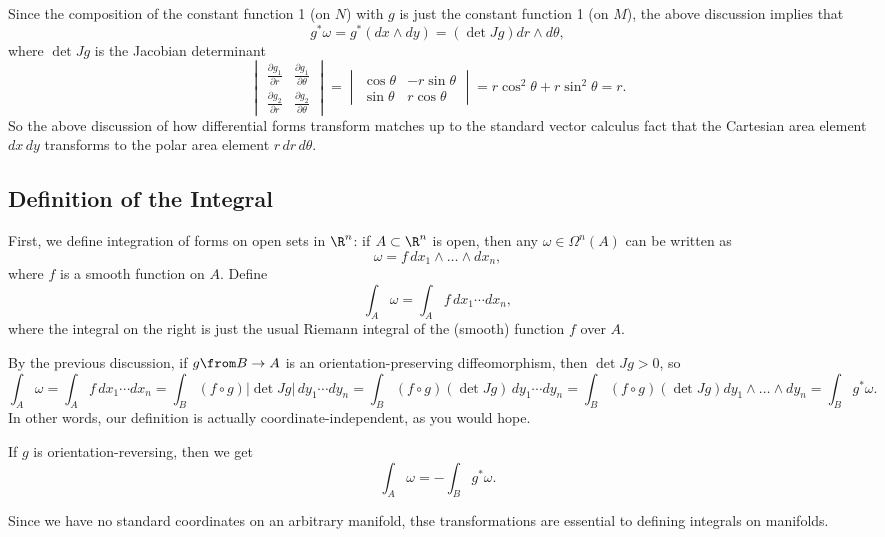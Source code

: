 \begin{example}
	Since the composition of the constant function 1 (on $N$) with $g$ is just the constant function 1 (on $M$), the above discussion implies that
	\[
		g^\ast \omega = g^\ast(dx \wedge dy) = (\det Jg) dr \wedge d\theta,
	\]
	where $\det Jg$ is the Jacobian determinant
	\[
		\begin{vmatrix} \frac{\partial g_1}{\partial r} & \frac{\partial g_1}{\partial \theta} \\ \frac{\partial g_2}{\partial r} & \frac{\partial g_2}{\partial \theta} \end{vmatrix} = \begin{vmatrix}\cos\theta & -r \sin \theta  \\ \sin \theta  & r \cos \theta\end{vmatrix} = r \cos^2\theta+r\sin^2\theta  = r.
	\]
	So the above discussion of how differential forms transform matches up to the standard vector calculus fact that the Cartesian area element $dx\, dy$ transforms to the polar area element $r\, dr \, d\theta$.
\end{example}

\subsection{Definition of the Integral}
\label{sub:definition_of_the_integral}

First, we define integration of forms on open sets in $\R^n$: if $A \subset \R^n$ is open, then any $\omega \in \Omega^n(A)$ can be written as
\[
	\omega = f\, dx_1 \wedge \dots \wedge dx_n,
\]
where $f$ is a smooth function on $A$. Define
\[
	\int_A \omega = \int_A f \, dx_1 \cdots dx_n,
\]
where the integral on the right is just the usual Riemann integral of the (smooth) function $f$ over $A$.

By the previous discussion, if $g \from B \to A$ is an orientation-preserving diffeomorphism, then $\det Jg > 0$, so
\[
	\int_A \omega = \int_A f \, dx_1 \cdots dx_n = \int_B(f \circ g) |\det Jg| \, dy_1 \cdots dy_n = \int_B (f \circ g) (\det Jg) \, dy_1 \cdots dy_n = \int_B(f \circ g) (\det Jg) dy_1 \wedge \dots \wedge dy_n = \int_B g^\ast \omega.
\]
In other words, our definition is actually coordinate-independent, as you would hope.

If $g$ is orientation-reversing, then we get
\[
	\int_A \omega = -\int_B g^\ast \omega.
\]

Since we have no standard coordinates on an arbitrary manifold, thse transformations are essential to defining integrals on manifolds.


